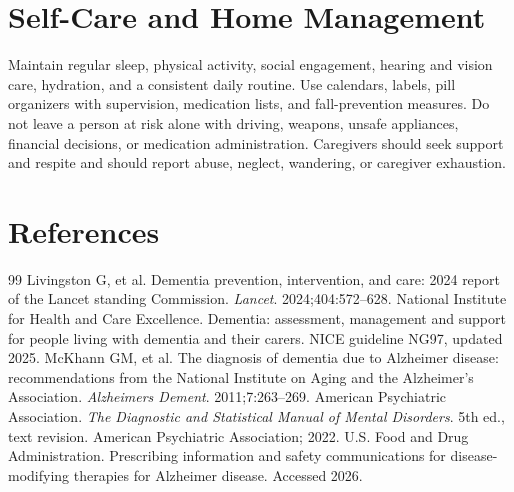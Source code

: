 \section*{Self-Care and Home Management}
Maintain regular sleep, physical activity, social engagement, hearing and vision care, hydration, and a consistent daily routine. Use calendars, labels, pill organizers with supervision, medication lists, and fall-prevention measures. Do not leave a person at risk alone with driving, weapons, unsafe appliances, financial decisions, or medication administration. Caregivers should seek support and respite and should report abuse, neglect, wandering, or caregiver exhaustion.

\section*{References}
\begin{thebibliography}{99}
 Livingston G, et al. Dementia prevention, intervention, and care: 2024 report of the Lancet standing Commission. \textit{Lancet}. 2024;404:572--628.
 National Institute for Health and Care Excellence. Dementia: assessment, management and support for people living with dementia and their carers. NICE guideline NG97, updated 2025.
 McKhann GM, et al. The diagnosis of dementia due to Alzheimer disease: recommendations from the National Institute on Aging and the Alzheimer's Association. \textit{Alzheimers Dement}. 2011;7:263--269.
 American Psychiatric Association. \textit{The Diagnostic and Statistical Manual of Mental Disorders}. 5th ed., text revision. American Psychiatric Association; 2022.
 U.S. Food and Drug Administration. Prescribing information and safety communications for disease-modifying therapies for Alzheimer disease. Accessed 2026.
\end{thebibliography}
